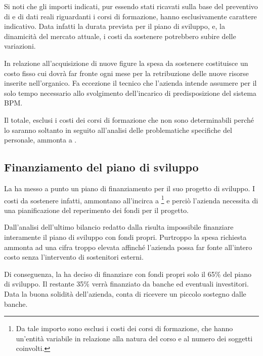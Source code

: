 
Si noti che gli importi indicati, pur essendo stati ricavati sulla base del preventivo di \team e di dati reali riguardanti i corsi di formazione, hanno esclusivamente carattere indicativo. Data infatti la durata prevista per il piano di sviluppo, e, la dinamicità del mercato attuale, i costi da sostenere potrebbero subire delle variazioni. 

In relazione all'acquisizione di nuove figure la spesa da sostenere costituisce un costo fisso cui \customer dovrà far fronte ogni mese per la retribuzione delle nuove risorse inserite nell'organico. Fa eccezione il tecnico che l'azienda intende assumere per il solo tempo necessario allo svolgimento dell'incarico di predisposizione del sistema BPM.

Il totale, esclusi i costi dei corsi di formazione che non sono determinabili  perché lo saranno soltanto in seguito all'analisi delle problematiche specifiche del personale, ammonta a \textbf{}.

\subsection{Finanziamento del piano di sviluppo}

La \customer ha messo a punto un piano di finanziamento per il suo progetto di sviluppo. I costi da sostenere infatti, ammontano all'incirca a \footnote{%
  Da tale importo sono esclusi i costi dei corsi di formazione, che hanno un'entità variabile in relazione alla natura del corso e al numero dei soggetti coinvolti.
} e perciò l'azienda necessita di una pianificazione del reperimento dei fondi per il progetto.

Dall'analisi dell'ultimo bilancio redatto dalla \customer risulta impossibile finanziare interamente il piano di sviluppo con fondi propri. Purtroppo la spesa richiesta ammonta ad una cifra troppo elevata affinché l'azienda possa far fonte all'intero costo senza l'intervento di sostenitori esterni.

Di conseguenza, la \customer ha deciso di finanziare con fondi propri solo il 65\% del piano di sviluppo. Il restante 35\% verrà finanziato da banche ed eventuali investitori. Data la buona solidità dell'azienda, \customer conta di ricevere un piccolo sostegno dalle banche.

